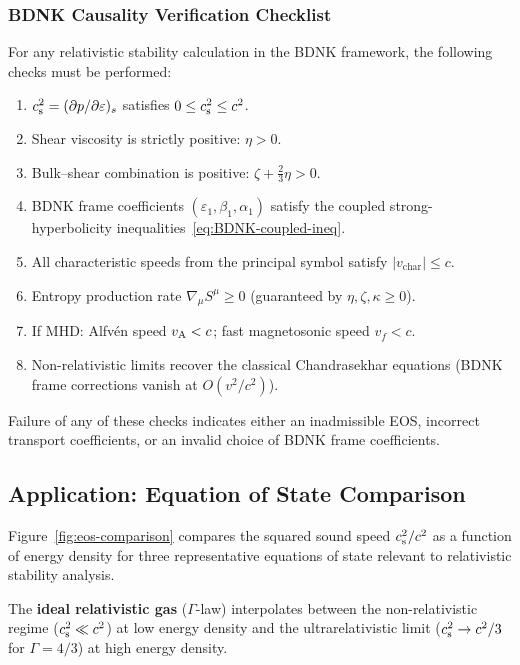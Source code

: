 \subsubsection{BDNK Causality Verification Checklist}
\label{subsubsec:causality-checklist}
For any relativistic stability calculation in the BDNK framework,
the following checks must be performed:
\begin{enumerate}
  \item[$\checkmark$] $c_{\mathrm{s}}^{2} = (\partial p/\partial\varepsilon)_{s}$ satisfies
    $0 \le c_{\mathrm{s}}^{2} \le c^{2}$.
  \item[$\checkmark$] Shear viscosity is strictly positive: $\eta > 0$.
  \item[$\checkmark$] Bulk--shear combination is positive:
    $\zeta + \tfrac{2}{3}\eta > 0$.
  \item[$\checkmark$] BDNK frame coefficients
    $(\varepsilon_{1}, \beta_{1}, \alpha_{1})$ satisfy the coupled
    strong-hyperbolicity inequalities~\eqref{eq:BDNK-coupled-ineq}.
  \item[$\checkmark$] All characteristic speeds from the principal symbol
    satisfy $|v_{\text{char}}| \le c$.
  \item[$\checkmark$] Entropy production rate
    $\nabla_{\mu}S^{\mu} \ge 0$
    (guaranteed by $\eta, \zeta, \kappa \ge 0$).
  \item[$\checkmark$] If MHD: Alfv\'en speed $v_{\mathrm{A}} < c$; fast magnetosonic
    speed $v_{f} < c$.
  \item[$\checkmark$] Non-relativistic limits recover the classical
    Chandrasekhar equations (BDNK frame corrections vanish at
    $O(v^{2}/c^{2})$).
\end{enumerate}
\noindent
Failure of any of these checks indicates either an inadmissible EOS,
incorrect transport coefficients, or an invalid choice of BDNK frame
coefficients.


\subsection{Application: Equation of State Comparison}
\label{subsec:eos-application}

Figure~\ref{fig:eos-comparison} compares the squared sound speed
$c_{\mathrm{s}}^2/c^2$ as a function of energy density for three representative
equations of state relevant to relativistic stability analysis.

The \textbf{ideal relativistic gas} ($\Gamma$-law) interpolates between
the non-relativistic regime ($c_{\mathrm{s}}^2 \ll c^2$) at low energy density
and the ultrarelativistic limit ($c_{\mathrm{s}}^2 \to c^2/3$ for $\Gamma = 4/3$)
at high energy density.

